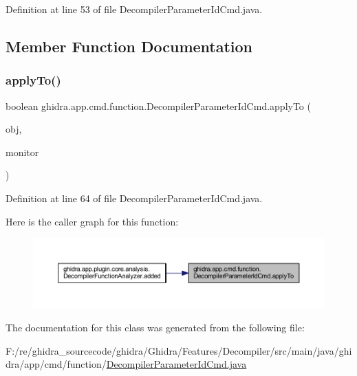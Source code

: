 Definition at line 53 of file Decompiler\+Parameter\+Id\+Cmd.\+java.



\subsection{Member Function Documentation}
\mbox{\label{classghidra_1_1app_1_1cmd_1_1function_1_1_decompiler_parameter_id_cmd_a320246a0ca39bb0566ba176453663889}} 
\subsubsection{\texorpdfstring{applyTo()}{applyTo()}}
{\footnotesize\ttfamily boolean ghidra.\+app.\+cmd.\+function.\+Decompiler\+Parameter\+Id\+Cmd.\+apply\+To (\begin{DoxyParamCaption}\item[{Domain\+Object}]{obj,  }\item[{final Task\+Monitor}]{monitor }\end{DoxyParamCaption})\hspace{0.3cm}{\ttfamily [inline]}}



Definition at line 64 of file Decompiler\+Parameter\+Id\+Cmd.\+java.

Here is the caller graph for this function\+:
\nopagebreak
\begin{figure}[H]
\begin{center}
\leavevmode
\includegraphics[width=350pt]{classghidra_1_1app_1_1cmd_1_1function_1_1_decompiler_parameter_id_cmd_a320246a0ca39bb0566ba176453663889_icgraph}
\end{center}
\end{figure}


The documentation for this class was generated from the following file\+:\begin{DoxyCompactItemize}
\item 
F\+:/re/ghidra\+\_\+sourcecode/ghidra/\+Ghidra/\+Features/\+Decompiler/src/main/java/ghidra/app/cmd/function/\mbox{\hyperlink{_decompiler_parameter_id_cmd_8java}{Decompiler\+Parameter\+Id\+Cmd.\+java}}\end{DoxyCompactItemize}
